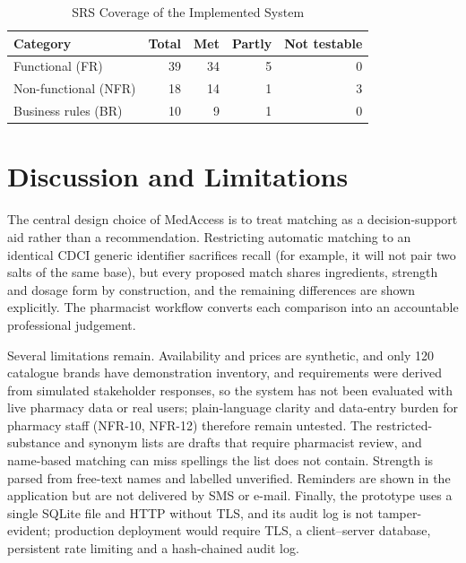 \documentclass[conference]{IEEEtran}
\begin{document}
\begin{table}[!t]
\caption{SRS Coverage of the Implemented System}
\label{tab:cov}
\centering
\scriptsize
\begin{tabular}{@{}lrrrr@{}}
\toprule
Category & Total & Met & Partly & Not testable \\
\midrule
Functional (FR)       & 39 & 34 & 5 & 0 \\
Non-functional (NFR)  & 18 & 14 & 1 & 3 \\
Business rules (BR)   & 10 & 9  & 1 & 0 \\
\bottomrule
\end{tabular}
\end{table}

\section{Discussion and Limitations}\label{sec:disc}
The central design choice of MedAccess is to treat matching as a decision-support aid rather than a recommendation. Restricting automatic matching to an identical CDCI generic identifier sacrifices recall (for example, it will not pair two salts of the same base), but every proposed match shares ingredients, strength and dosage form by construction, and the remaining differences are shown explicitly. The pharmacist workflow converts each comparison into an accountable professional judgement.

Several limitations remain. Availability and prices are synthetic, and only 120 catalogue brands have demonstration inventory, and requirements were derived from simulated stakeholder responses, so the system has not been evaluated with live pharmacy data or real users; plain-language clarity and data-entry burden for pharmacy staff (NFR-10, NFR-12) therefore remain untested. The restricted-substance and synonym lists are drafts that require pharmacist review, and name-based matching can miss spellings the list does not contain. Strength is parsed from free-text names and labelled unverified. Reminders are shown in the application but are not delivered by SMS or e-mail. Finally, the prototype uses a single SQLite file and HTTP without TLS, and its audit log is not tamper-evident; production deployment would require TLS, a client--server database, persistent rate limiting and a hash-chained audit log.
\end{document}
